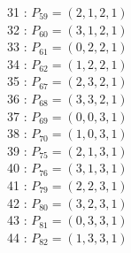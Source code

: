 \documentclass{article}
\begin{document}
{\begin{multicols}{3}
31 : $P_{59}=( 2, 1, 2, 1 )$\\
32 : $P_{60}=( 3, 1, 2, 1 )$\\
33 : $P_{61}=( 0, 2, 2, 1 )$\\
34 : $P_{62}=( 1, 2, 2, 1 )$\\
35 : $P_{67}=( 2, 3, 2, 1 )$\\
36 : $P_{68}=( 3, 3, 2, 1 )$\\
37 : $P_{69}=( 0, 0, 3, 1 )$\\
38 : $P_{70}=( 1, 0, 3, 1 )$\\
39 : $P_{75}=( 2, 1, 3, 1 )$\\
40 : $P_{76}=( 3, 1, 3, 1 )$\\
41 : $P_{79}=( 2, 2, 3, 1 )$\\
42 : $P_{80}=( 3, 2, 3, 1 )$\\
43 : $P_{81}=( 0, 3, 3, 1 )$\\
44 : $P_{82}=( 1, 3, 3, 1 )$\\
\end{multicols}


%


%


}%
\end{document}
